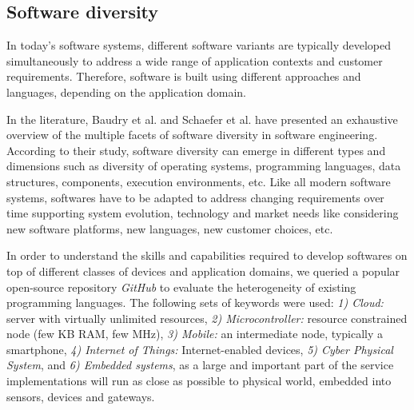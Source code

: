 





\subsection{Software diversity}
\label{sec:Software diversity}
In today's software systems, different software variants are typically developed simultaneously to address a wide range of application contexts and customer requirements\cite{schaefer2012software}. 
Therefore, software is built using different approaches and languages, depending on the application domain.

In the literature, Baudry et al.\cite{baudry2015multiple} and Schaefer et al.\cite{schaefer2012software} have presented an exhaustive overview of the multiple facets of software diversity in software engineering. 
According to their study, software diversity can emerge in different types and dimensions such as diversity of operating systems, programming languages, data structures, components, execution environments, etc. 
Like all modern software systems, softwares have to be adapted to address changing requirements over time supporting system evolution, technology and market needs like considering new software platforms, new languages, new customer choices, etc.

In order to understand the skills and capabilities required to develop softwares on top of different classes of devices and application domains, we queried a popular open-source repository \textit{GitHub} to evaluate the heterogeneity of existing programming languages.  
The following sets of keywords were used: \textit{1) Cloud:} server with virtually unlimited resources, \textit{2) Microcontroller:} resource constrained node (few KB RAM, few MHz),  \textit{3) Mobile:} an intermediate node, typically a smartphone,  \textit{4) Internet of Things:} Internet-enabled devices,  \textit{5) Cyber Physical System}, and  \textit{6) Embedded systems}, as a large and important part of the service implementations will run as close as possible to physical world, embedded into sensors, devices and gateways.

